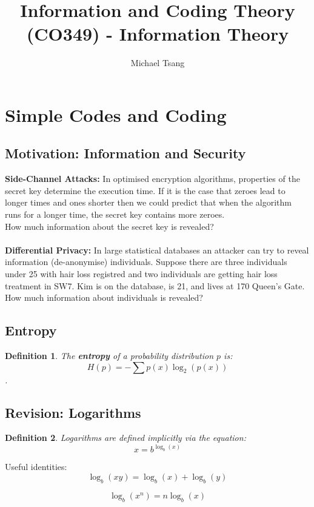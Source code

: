 \documentclass[11pt]{article}
\title{Information and Coding Theory (CO349) - Information Theory}
\author{Michael Tsang}
\newtheorem{defn}{Definition}
\begin{document}
\maketitle

\section{Simple Codes and Coding}
\subsection{Motivation: Information and Security}
\textbf{Side-Channel Attacks:}
In optimised encryption algorithms, properties of the secret key determine the execution time.
If it is the case that zeroes lead to longer times and ones shorter then we could predict that when the algorithm runs for a longer time, the secret key contains more zeroes. \\
How much information about the secret key is revealed?
\\ \\
\textbf{Differential Privacy:}
In large statistical databases an attacker can try to reveal information (de-anonymise) individuals.
Suppose there are three individuals under 25 with hair loss registred and two individuals are getting hair loss treatment in SW7.
Kim is on the database, is 21, and lives at 170 Queen's Gate. \\
How much information about individuals is revealed?

\subsection{Entropy}
\begin{defn}
  The \textbf{entropy} of a probability distribution $p$ is:
  \[ H(p) = - \sum p(x) \log_{2} (p(x)) \].
\end{defn}

\subsection{Revision: Logarithms}
\begin{defn}
  Logarithms are defined implicitly via the equation:
  \[ x = b^{\log_{b} (x)}\]
\end{defn}

Useful identities:
\[ \log_{b} (xy) = \log_{b} (x) + \log_{b} (y) \]

\[ \log_{b} (x^{n}) = n \log_{b} (x) \]
\end{document}
